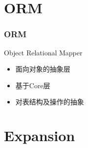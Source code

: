 \documentclass{beamer}
\begin{document}
\section{ORM}
\begin{frame}
    \frametitle{ORM}
\begin{block}{Object Relational Mapper}
\begin{itemize}
\item 面向对象的抽象层
\item 基于Core层
\item 对表结构及操作的抽象
\end{itemize}
\end{block}
\end{frame}

\section{Expansion}
\end{document}
